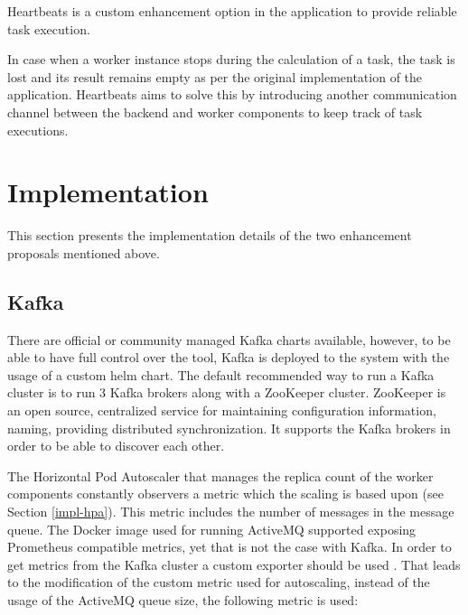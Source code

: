 
Heartbeats is a custom enhancement option in the application to provide reliable task execution.

In case when a worker instance stops during the calculation of a task, the task is lost and its result remains empty as per the original implementation of the application. Heartbeats aims to solve this by introducing another communication channel between the backend and worker components to keep track of task executions.

\section{Implementation}

This section presents the implementation details of the two enhancement proposals mentioned above.

\subsection{Kafka}


There are official or community managed Kafka charts available, however, to be able to have full control over the tool, Kafka is deployed to the system with the usage of a custom helm chart. The default recommended way to run a Kafka cluster is to run 3 Kafka brokers along with a ZooKeeper cluster. ZooKeeper \cite{ZooKeeper} is an open source, centralized service for maintaining configuration information, naming, providing distributed synchronization. It supports the Kafka brokers in order to be able to discover each other.

The Horizontal Pod Autoscaler that manages the replica count of the worker components constantly observers a metric which the scaling is based upon (see Section \ref{impl-hpa}). This metric includes the number of messages in the message queue. The Docker image used for running ActiveMQ supported exposing Prometheus compatible metrics, yet that is not the case with Kafka. In order to get metrics from the Kafka cluster a custom exporter should be used \cite{KafkaExporter}. That leads to the modification of the custom metric used for autoscaling, instead of the usage of the ActiveMQ queue size, the following metric is used:

